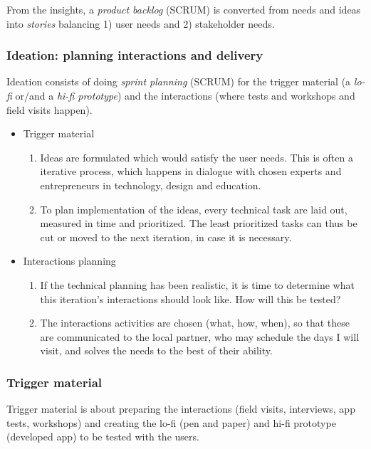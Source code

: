     From the insights, a \textit{product backlog} (SCRUM) is converted from needs and ideas into \textit{stories} balancing 1) user needs and 2) stakeholder needs.

\subsubsection{Ideation: planning interactions and delivery}
  Ideation consists of doing \textit{sprint planning} (SCRUM) for the trigger material (a \textit{lo-fi} or/and a \textit{hi-fi prototype}) and the interactions (where tests and workshops and field visits happen).

    \begin{itemize}
    \item Trigger material
      \begin{enumerate}
      \item Ideas are formulated which would satisfy the user needs. This is often a iterative process, which happens in dialogue with chosen experts and entrepreneurs in technology, design and education.
      \item To plan implementation of the ideas, every technical task are laid out, measured in time and prioritized. The least prioritized tasks can thus be cut or moved to the next iteration, in case it is necessary.
      \end{enumerate}
    \item Interactions planning
      \begin{enumerate}
      \item If the technical planning has been realistic, it is time to determine what this iteration's interactions should look like. How will this be tested?
      \item The interactions activities are chosen (what, how, when), so that these are communicated to the local partner, who may schedule the days I will visit, and solves the needs to the best of their ability.
      \end{enumerate}
    \end{itemize}

  \subsubsection{Trigger material}
  Trigger material is about preparing the interactions (field visits, interviews, app tests, workshops) and creating the lo-fi (pen and paper) and hi-fi prototype (developed app) to be tested with the users.


